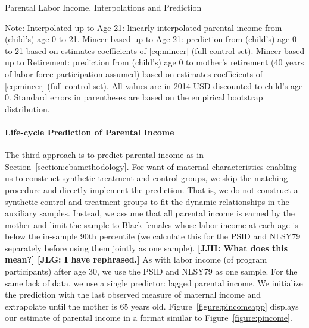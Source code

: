 \begin{table}[H]
\begin{threeparttable}
\caption{Parental Labor Income, Interpolations and Prediction}
\label{table:psens}
\centering

\begin{tablenotes}
\footnotesize
\item Note:  Interpolated up to Age 21: linearly interpolated parental income from (child's) age 0 to 21. Mincer-based up to Age 21: prediction from (child's) age 0 to 21 based on estimates coefficients of \eqref{eq:mincer} (full control set). Mincer-based up to Retirement: prediction from (child's) age 0 to mother's retirement (40 years of labor force participation assumed) based on estimates coefficients of \eqref{eq:mincer} (full control set). All values are in 2014 USD discounted to child's age 0. Standard errors in parentheses are based on the empirical bootstrap distribution.
\end{tablenotes}
\end{threeparttable}
\end{table}

\paragraph{Life-cycle Prediction of Parental Income} \label{appendix:lcyclepincome}

\noindent The third approach is to predict parental income as in Section~\ref{section:cbamethodology}. For want of maternal characteristics enabling us to construct synthetic treatment and control groups, we skip the matching procedure and directly implement the prediction. That is, we do not construct a synthetic control and treatment groups to fit the dynamic relationships in the auxiliary samples. Instead, we assume that all parental income is earned by the mother and limit the sample to Black females whose labor income at each age is below the in-sample 90th percentile (we calculate this for the PSID and NLSY79 separately before using them jointly as one sample). \textbf{[JJH: What does this mean?] [JLG: I have rephrased.]} As with labor income (of program participants) after age 30, we use the PSID and NLSY79 as one sample. For the same lack of data, we use a single predictor: lagged parental income. We initialize the prediction with the last observed measure of maternal income and extrapolate until the mother is 65 years old. Figure~\ref{figure:pincomeapp} displays our estimate of parental income in a format similar to Figure~\ref{figure:pincome}.\\

